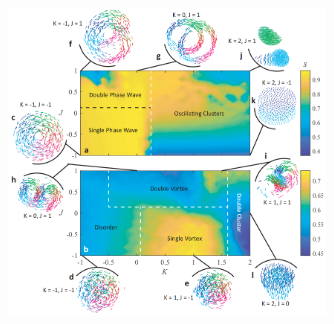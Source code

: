 \documentclass[10pt,aspectratio=43,mathserif,table]{beamer}
\begin{document}
\begin{frame}
    \begin{figure}
        \centering
        \includegraphics[width=0.75\textwidth]{fig6.png}
    \end{figure}
\end{frame}


\end{document}
